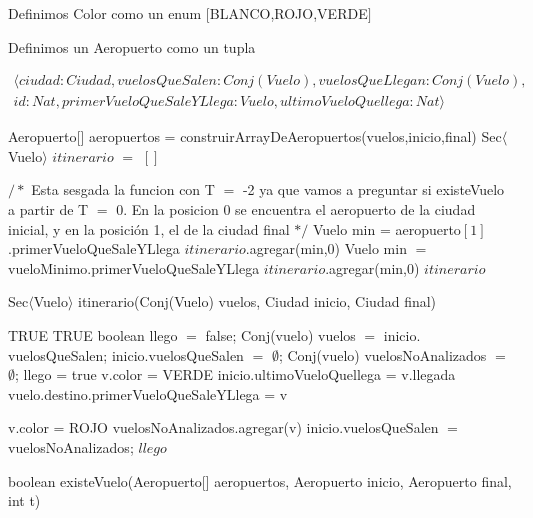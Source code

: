 Definimos Color como un enum $[$BLANCO,ROJO,VERDE$]$

Definimos un Aeropuerto como un tupla 

\begin{align*}
\langle ciudad:Ciudad,vuelosQueSalen:
Conj(Vuelo),vuelosQueLlegan:Conj(Vuelo),\\
id:Nat,primerVueloQueSaleYLlega:Vuelo,ultimoVueloQuellega:Nat \rangle 
\end{align*}

\begin{algorithm}[H]
\begin{algorithmic}[1]
\STATE Aeropuerto[] aeropuertos = construirArrayDeAeropuertos(vuelos,inicio,final)
\STATE Sec$\langle$Vuelo$\rangle$ $itinerario$ $=$ $[]$

$/*$ Esta sesgada la funcion con T $=$ -2 ya que vamos a preguntar si existeVuelo a partir de T $=$ 0.
En la posicion 0 se encuentra el aeropuerto de la ciudad inicial, y en la posici\'on 1, el de la ciudad final $*/$
	\STATE Vuelo min = aeropuerto$[1]$.primerVueloQueSaleYLlega
\STATE $itinerario$.agregar(min,0)
	\STATE Vuelo min $=$ vueloMinimo.primerVueloQueSaleYLlega
	\STATE $itinerario$.agregar(min,0)
\ENDWHILE
\ENDIF
\RETURN $itinerario$
\caption{Sec$\langle$Vuelo$\rangle$ itinerario(Conj(Vuelo) vuelos, Ciudad inicio, Ciudad final)}%
\end{algorithmic}
\end{algorithm}



\begin{algorithm}[H]
\begin{algorithmic}[1]
		\RETURN TRUE
\ENDIF
{}	
		\RETURN TRUE
\ENDIF
\STATE boolean llego $=$ false;
\STATE Conj(vuelo) vuelos $=$ inicio$.$vuelosQueSalen;
\STATE inicio$.$vuelosQueSalen $=$ $\emptyset$;
\STATE Conj(vuelo) vuelosNoAnalizados $=$ $\emptyset$;
				\STATE llego = true
				\STATE v.color = VERDE
					\STATE inicio.ultimoVueloQuellega = v.llegada
				\ENDIF
					\STATE vuelo.destino.primerVueloQueSaleYLlega = v
				\ENDIF

			\ELSE
				\STATE v.color = ROJO								
	    		\ENDIF    			
		\ENDIF
	\ELSE
		\STATE vuelosNoAnalizados.agregar(v)										    
    \ENDIF
\ENDFOR
\STATE inicio$.$vuelosQueSalen $=$ vuelosNoAnalizados;
\RETURN $llego$
\caption{boolean existeVuelo(Aeropuerto[] aeropuertos, Aeropuerto inicio, Aeropuerto final, int t)}%
\end{algorithmic}
\end{algorithm}

